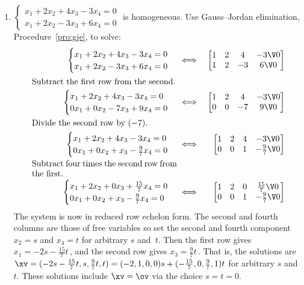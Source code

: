\begin{example}
\begin{enumerate}
\item \label{eg:homosysiv} 
\(\begin{cases}
x_1+2x_2+4x_3-3x_4=0\\
x_1+2x_2-3x_3+6x_4=0
\end{cases}\) is homogeneous.  
Use Gauss--Jordan elimination, Procedure~\ref{pro:gje}, to solve: 
\begin{eqnarray*}
\begin{cases}
x_1+2x_2+4x_3-3x_4=0\\
x_1+2x_2-3x_3+6x_4=0
\end{cases}
&\iff&%
\begin{bmatrix} 1&2&4&-3\V0
\\1&2&-3&6\V0
 \end{bmatrix}
\\
\parbox{0.5\linewidth}{Subtract the first row from the second.}
\\
\begin{cases}
x_1+2x_2+4x_3-3x_4=0\\
0x_1+0x_2-7x_3+9x_4=0
\end{cases}
&\iff&%
\begin{bmatrix} 1&2&4&-3\V0
\\0&0&-7&9\V0
 \end{bmatrix}
\\
\parbox{0.5\linewidth}{Divide the second row by~\((-7)\).}
\\
\begin{cases}
x_1+2x_2+4x_3-3x_4=0\\
0x_1+0x_2+x_3-\frac97x_4=0
\end{cases}
&\iff&%
\begin{bmatrix} 1&2&4&-3\V0
\\0&0&1&-\frac97\V0
 \end{bmatrix}
\\
\parbox{0.5\linewidth}{Subtract four times the second row from the first.}
\\
\begin{cases}
x_1+2x_2+0x_3+\frac{15}7x_4=0\\
0x_1+0x_2+x_3-\frac97x_4=0
\end{cases}
&\iff&%
\begin{bmatrix} 1&2&0&\frac{15}7\V0
\\0&0&1&-\frac97\V0
 \end{bmatrix}
\end{eqnarray*}
The system is now in reduced row echelon form.  
The second and fourth columns are those of free variables so set the second and fourth component \(x_2=s\) and \(x_4=t\) for arbitrary \(s\) and~\(t\).
Then the first row gives \(x_1=-2s-\frac{15}7t\)\,, and the second row gives \(x_3=\frac97t\)\,.
That is, the solutions are \(\xv=(-2s-\frac{15}7t,s,\frac97t,t) =(-2,1,0,0)s+(-\frac{15}7,0,\frac97,1)t\) for arbitrary \(s\) and~\(t\).
These solutions include \(\xv=\ov\) via the choice \(s=t=0\).
\end{enumerate}
\end{example}


